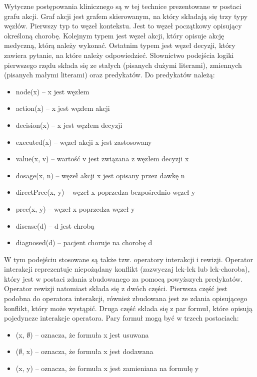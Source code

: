 Wytyczne postępowania klinicznego są w tej technice prezentowane w postaci grafu akcji.\cite{SzWilk} Graf akcji jest grafem skierowanym, na który składają się trzy typy węzłów. Pierwszy typ to węzeł kontekstu. Jest to węzeł początkowy opisujący określoną chorobę. Kolejnym typem jest węzeł akcji, który opisuje akcję medyczną, którą należy wykonać. Ostatnim typem jest węzeł decyzji, który zawiera pytanie, na które należy odpowiedzieć. Słownictwo podejścia logiki pierwszego rzędu składa się ze stałych (pisanych dużymi literami), zmiennych (pisanych małymi literami) oraz predykatów. Do predykatów należą:
\begin{itemize}
\item{node(x) – x jest węzłem}
\item{action(x) – x jest węzłem akcji}
\item{decision(x) – x jest węzłem decyzji}
\item{executed(x) – węzeł akcji x jest zastosowany}
\item{value(x, v) – wartość v jest związana z węzłem decyzji x}
\item{dosage(x, n) – węzeł akcji x jest opisany przez dawkę n}
\item{directPrec(x, y) – węzeł x poprzedza bezpośrednio węzeł y}
\item{prec(x, y) – węzeł x poprzedza węzeł y}
\item{disease(d) – d jest chrobą}
\item{diagnosed(d) – pacjent choruje na chorobę d}
\end{itemize}
W tym podejściu stosowane są także tzw. operatory interakcji i rewizji. Operator interakcji reprezentuje niepożądany konflikt (zazwyczaj lek-lek lub lek-choroba), który jest w postaci zdania zbudowanego za pomocą powyższych predykatów. Operator rewizji natomiast składa się z dwóch części. Pierwsza część jest podobna do operatora interakcji, również zbudowana jest ze zdania opisującego konflikt, który może wystąpić. Druga część składa się z par formuł, które opisują pojedyncze interakcje operatora. Pary formuł mogą być w trzech postaciach:
\begin{itemize}
\item{(x, $\emptyset$) – oznacza, że formuła x jest usuwana}
\item{($\emptyset$, x) – oznacza, że formuła x jest dodawana}
\item{(x, y) – oznacza, że formuła x jest zamieniana na formułę y}
\end{itemize}


